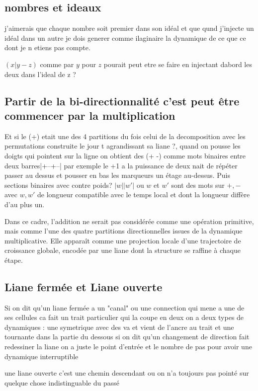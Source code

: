 \documentclass{article}
\begin{document}
\subsection{nombres et ideaux}
j'aimerais que chaque nombre soit premier dans son idéal et que qund j'injecte un idéal dans un autre je dois generer comme ilaginaire la dynamique de ce que ce dont je n etiens pas compte.

$(x|y-z)$ comme par $y$ pour $z$  pourait peut etre se faire en injectant dabord les deux dans l'ideal de z ?

\subsection{Partir de la bi-directionnalité c'est peut être commencer par la multiplication}
Et si le (+) etait une des 4 partitions du fois celui de la decomposition avec les permutations construite le jour t agrandissant sa liane ?, quand on pousse les doigts qui pointent sur la ligne on obtient des (+ -) comme mots binaires entre deux barres|+--+--| par exemple le +1 a la puissance de deux nait de répéter passer au dessus et pousser en bas les marqueurs un étage au-dessus.
Puis sections binaires avec contre poids? $|w||w'|$ ou $w$ et $w'$ sont des mots sur $+, -$ avec  $w, w' $ de longueur compatible avec le temps local et dont la longueur diffère d'au plus un. 

Dans ce cadre, l’addition ne serait pas considérée comme une opération primitive, mais comme l’une des quatre partitions directionnelles issues de la dynamique multiplicative. Elle apparaît comme une projection locale d’une trajectoire de croissance globale, encodée par une liane dont la structure se raffine à chaque étape.

\subsection{Liane fermée et Liane ouverte}

Si on dit qu'un liane fermée a un "canal" ou une connection qui mene a une de ses cellules ca fait un trait particulier qui la coupe en deux on a deux types de dynamiques : une symetrique avec des va et vient de l'ancre au trait et une tournante dans la partie du dessous si on dit qu'un changement de direction fait redessiner la liane on a juste le point d'entrée et le nombre de pas pour avoir une dynamique interruptible

une liane ouverte c'est une chemin descendant ou on n'a toujours pas pointé sur quelque chose indistinguable du passé
\end{document}
